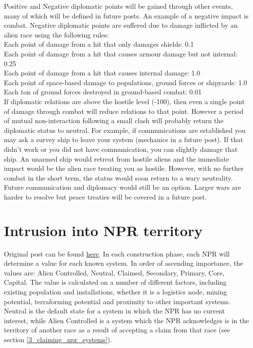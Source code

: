 \documentclass[../Aurora C# unofficial manual.tex]{subfiles}
\begin{document}
	Positive and Negative diplomatic points will be gained through other events, many of which will be defined in future posts. An example of a negative impact is combat. Negative diplomatic points are suffered due to damage inflicted by an alien race using the following rules:\\
	Each point of damage from a hit that only damages shields: 0.1\\
	Each point of damage from a hit that causes armour damage but not internal: 0.25\\
	Each point of damage from a hit that causes internal damage: 1.0\\
	Each point of space-based damage to populations, ground forces or shipyards: 1.0\\
	Each ton of ground forces destroyed in ground-based combat: 0.01\\
	
	If diplomatic relations are above the hostile level (-100), then even a single point of damage through combat will reduce relations to that point. However a period of mutual non-interaction following a small clash will probably return the diplomatic status to neutral. For example, if communications are established you may ask a survey ship to leave your system (mechanics in a future post). If that didn't work or you did not have communication, you can slightly damage that ship. An unarmed ship would retreat from hostile aliens and the immediate impact would be the alien race treating you as hostile. However, with no further combat in the short term, the status would soon return to a wary neutrality. Future communication and diplomacy would still be an option. Larger wars are harder to resolve but peace treaties will be covered in a future post.
	
	\section{Intrusion into NPR territory}\label{2_intrusion_into_npr}
	Original post can be found
	\href{http://aurora2.pentarch.org/index.php?topic=8495.msg118318#msg118318}{here}.
	\newline\newline
	In each construction phase, each NPR will determine a value for each known system. In order of ascending importance, the values are: Alien Controlled, Neutral, Claimed, Secondary, Primary, Core, Capital. The value is calculated on a number of different factors, including existing population and installations, whether it is a logistics node, mining potential, terraforming potential and proximity to other important systems. Neutral is the default state for a system in which the NPR has no current interest, while Alien Controlled is a system which the NPR acknowledges is in the territory of another race as a result of accepting a claim from that race (see section \ref{3_claiming_npr_systems}).
	
\end{document}
